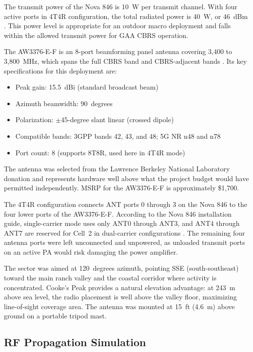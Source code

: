 \documentclass[
    left=1.5in,
    right=1.25in,
    top=1.25in,
    bottom=1.25in
]{CalPolySeniorProject}
\begin{document}
The transmit power of the Nova 846 is 10~W per transmit channel. With four
active ports in 4T4R configuration, the total radiated power is 40~W, or
46~dBm \autocite{baicells2023nova846}. This power level is appropriate for an
outdoor macro deployment and falls within the allowed transmit power for GAA
CBRS operation.

The AW3376-E-F is an 8-port beamforming panel antenna covering 3,400 to
3,800~MHz, which spans the full CBRS band and CBRS-adjacent bands
\autocite{alphawireless2022aw3376}. Its key specifications for this deployment
are:

\begin{itemize}
    \item Peak gain: 15.5~dBi (standard broadcast beam)
    \item Azimuth beamwidth: 90~degrees
    \item Polarization: $\pm$45-degree slant linear (crossed dipole)
    \item Compatible bands: 3GPP bands 42, 43, and 48; 5G NR n48 and n78
    \item Port count: 8 (supports 8T8R, used here in 4T4R mode)
\end{itemize}

The antenna was selected from the Lawrence Berkeley National Laboratory donation
and represents hardware well above what the project budget would have permitted
independently. MSRP for the AW3376-E-F is approximately \$1,700.

The 4T4R configuration connects ANT ports 0 through 3 on the Nova 846 to the
four lower ports of the AW3376-E-F. According to the Nova 846 installation
guide, single-carrier mode uses only ANT0 through ANT3, and ANT4 through ANT7
are reserved for Cell~2 in dual-carrier configurations
\autocite{baicells2023nova846}. The remaining four antenna ports were left
unconnected and unpowered, as unloaded transmit ports on an active PA would risk
damaging the power amplifier.

The sector was aimed at 120~degrees azimuth, pointing SSE (south-southeast)
toward the main ranch valley and the coastal corridor where activity is
concentrated. Cooke's Peak provides a natural elevation advantage: at 243~m
above sea level, the radio placement is well above the valley floor, maximizing
line-of-sight coverage area. The antenna was mounted at 15~ft (4.6~m) above
ground on a portable tripod mast.

\subsection{RF Propagation Simulation}
\end{document}
